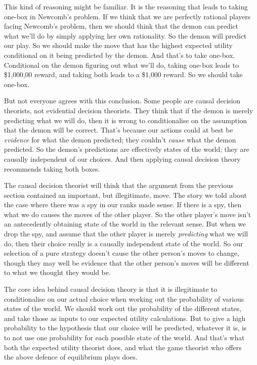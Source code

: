 This kind of reasoning might be familiar. It is the reasoning that leads to taking one-box in Newcomb's problem. If we think that we are perfectly rational players facing Newcomb's problem, then we should think that the demon can predict what we'll do by simply applying her own rationality. So the demon will predict our play. So we should make the move that has the highest expected utility conditional on it being predicted by the demon. And that's to take one-box. Conditional on the demon figuring out what we'll do, taking one-box leads to \$1,000,00 reward, and taking both leads to a \$1,000 reward. So we should take one-box.

But not everyone agrees with this conclusion. Some people are causal decision theorists, not evidential decision theorists. They think that if the demon is merely predicting what we will do, then it is wrong to conditionalise on the assumption that the demon will be correct. That's because our actions could at best be \textit{evidence} for what the demon predicted; they couldn't \textit{cause} what the demon predicted. So the demon's predictions are effectively states of the world; they are causally independent of our choices. And then applying causal decision theory recommends taking both boxes.

The causal decision theorist will think that the argument from the previous section contained an important, but illegitimate, move. The story we told about the case where there was a spy in our ranks made sense. If there is a spy, then what we do causes the moves of the other player. So the other player's move isn't an antecedently obtaining state of the world in the relevant sense. But when we drop the spy, and assume that the other player is merely \textit{predicting} what we will do, then their choice really is a causally independent state of the world. So our selection of a pure strategy doesn't cause the other person's moves to change, though they may well be evidence that the other person's moves will be different to what we thought they would be.

The core idea behind causal decision theory is that it is illegitimate to conditionalise on our actual choice when working out the probability of various states of the world. We should work out the probability of the different states, and take those as inputs to our expected utility calculations. But to give a high probability to the hypothesis that our choice will be predicted, whatever it is, is to not use one probability for each possible state of the world. And that's what both the expected utility theorist does, and what the game theorist who offers the above defence of equilibrium plays does.

